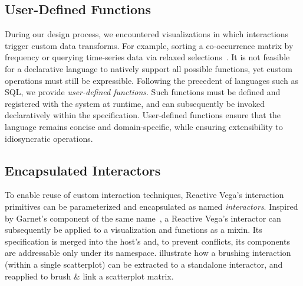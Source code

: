 \vspace{-20pt}

\subsection{User-Defined Functions}
\label{sec:udfs}

\vspace{-7pt}

During our design process, we encountered visualizations in which interactions
trigger custom data transforms. For example, sorting a co-occurrence matrix by
frequency or querying time-series data via relaxed
selections~\cite{holz:relaxed}. It is not feasible for a declarative language to
natively support all possible functions, yet custom operations must still be
expressible. Following the precedent of languages such as SQL, we provide
\emph{user-defined functions}. Such functions must be defined and registered
with the system at runtime, and can subsequently be invoked declaratively within
the specification. User-defined functions ensure that the language remains
concise and domain-specific, while ensuring extensibility to idiosyncratic
operations.

\vspace{-20pt}

\subsection{Encapsulated Interactors}

\vspace{-7pt}

To enable reuse of custom interaction techniques, Reactive Vega's interaction
primitives can be parameterized and encapsulated as named \emph{interactors}.
Inspired by Garnet's component of the same name~\cite{myers:garnet}, a Reactive
Vega's interactor can subsequently be applied to a visualization and functions
as a mixin. Its specification is merged into the host's and, to prevent
conflicts, its components are addressable only under its namespace.
 illustrate how a brushing
interaction (within a single scatterplot) can be extracted to a standalone
interactor, and reapplied to brush \& link a scatterplot matrix.
